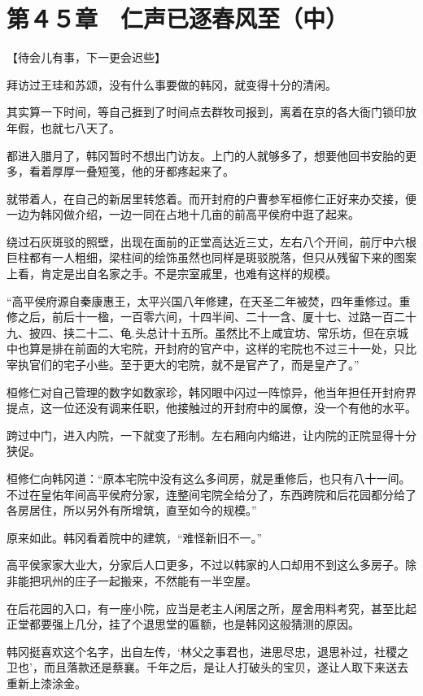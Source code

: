 \section{第４５章　仁声已逐春风至（中）}

【待会儿有事，下一更会迟些】

拜访过王珪和苏颂，没有什么事要做的韩冈，就变得十分的清闲。

其实算一下时间，等自己捱到了时间点去群牧司报到，离着在京的各大衙门锁印放年假，也就七八天了。

都进入腊月了，韩冈暂时不想出门访友。上门的人就够多了，想要他回书安胎的更多，看着厚厚一叠短笺，他的牙都疼起来了。

就带着人，在自己的新居里转悠着。而开封府的户曹参军桓修仁正好来办交接，便一边为韩冈做介绍，一边一同在占地十几亩的前高平侯府中逛了起来。

绕过石灰斑驳的照壁，出现在面前的正堂高达近三丈，左右八个开间，前厅中六根巨柱都有一人粗细，梁柱间的绘饰虽然也同样是斑驳脱落，但只从残留下来的图案上看，肯定是出自名家之手。不是宗室戚里，也难有这样的规模。

“高平侯府源自秦康惠王，太平兴国八年修建，在天圣二年被焚，四年重修过。重修之后，前后十一楹，一百零六间，十四半间、二十一含、厦十七、过路一百二十九、披四、挟二十二、龟.头总计十五所。虽然比不上咸宜坊、常乐坊，但在京城中也算是排在前面的大宅院，开封府的官产中，这样的宅院也不过三十一处，只比宰执官们的宅子小些。至于更大的宅院，就不是官产了，而是皇产了。”

桓修仁对自己管理的数字如数家珍，韩冈眼中闪过一阵惊异，他当年担任开封府界提点，这一位还没有调来任职，他接触过的开封府中的属僚，没一个有他的水平。

跨过中门，进入内院，一下就变了形制。左右厢向内缩进，让内院的正院显得十分狭促。

桓修仁向韩冈道：“原本宅院中没有这么多间房，就是重修后，也只有八十一间。不过在皇佑年间高平侯府分家，连整间宅院全给分了，东西跨院和后花园都分给了各房居住，所以另外有所增筑，直至如今的规模。”

原来如此。韩冈看着院中的建筑，“难怪新旧不一。”

高平侯家家大业大，分家后人口更多，不过以韩家的人口却用不到这么多房子。除非能把巩州的庄子一起搬来，不然能有一半空屋。

在后花园的入口，有一座小院，应当是老主人闲居之所，屋舍用料考究，甚至比起正堂都要强上几分，挂了个退思堂的匾额，也是韩冈这般猜测的原因。

韩冈挺喜欢这个名字，出自左传，‘林父之事君也，进思尽忠，退思补过，社稷之卫也’，而且落款还是蔡襄。千年之后，是让人打破头的宝贝，遂让人取下来送去重新上漆涂金。

